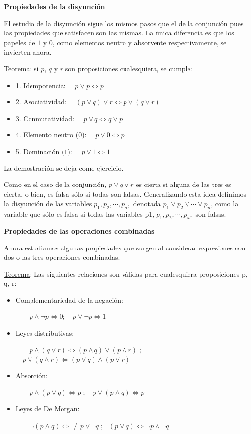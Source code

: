 \textbf{Propiedades de la disyunción}

El estudio de la disyunción sigue los mismos pasos que el de la conjunción pues las propiedades que satisfacen son las mismas. La única diferencia es que los papeles de $1$ y $0$, como elementos neutro y absorvente respectivamente, se invierten ahora.

\underline{Teorema}:   si $p$, $q$ y $r$ son proposiciones cualesquiera, se cumple:
\begin{itemize}
\item 1. Idempotencia:   $\quad p \vee p \Leftrightarrow p$
\item 2. Asociatividad:   $\quad (p \vee q) \vee r \Leftrightarrow p \vee ( q \vee r)$
\item 3. Conmutatividad:   $ \quad p \vee q \Leftrightarrow q \vee p$
\item 4. Elemento neutro ($0$):   $\quad p \vee 0 \Leftrightarrow p$ 
\item 5. Dominación ($1$):   $\quad p \vee 1 \Leftrightarrow 1$
\end{itemize}

La demostración se deja como ejercicio.

Como en el caso de la conjunción, $p \vee q \vee r$ es cierta si alguna de las tres es cierta, o bien, es falsa sólo si todas son falsas. Generalizando esta idea definimos la disyunción de las variables $p_1, p_2, \cdots , p_n,$ denotada $p_1 \vee p_2 \vee \cdots \vee  p_n$, como la variable que sólo es falsa si todas las variables p1, $p_1, p_2, \cdots , p_n,$  son falsas.

\textbf{Propiedades de las operaciones combinadas}

Ahora estudiamos algunas propiedades que surgen al considerar expresiones con dos o las tres operaciones combinadas.

\underline{Teorema}: Las siguientes relaciones son válidas para cualesquiera proposiciones p, q, r:

\begin{itemize}	
\item Complementariedad de la negación: 

$\qquad p \wedge \neg p \Leftrightarrow 0; \quad p \vee \neg p \Leftrightarrow 1 $ 

\item Leyes distributivas: 

$\qquad p \wedge (q \vee r) \Leftrightarrow (p \wedge q ) \vee (p \wedge r ) \; ;$
$\quad p \vee (q \wedge r) \Leftrightarrow (p \vee q ) \wedge (p \vee r )$

\item Absorción: 

$\qquad p \wedge (p \vee q) \Leftrightarrow p\; ; \quad p \vee (p \wedge q) \Leftrightarrow p$

\item Leyes de De Morgan: 
 
$\qquad \neg (p \wedge q ) \Leftrightarrow \neq p \vee \neg q\; ; \neg (p \vee q) \Leftrightarrow \neg p \wedge \neg q $

\end{itemize}

